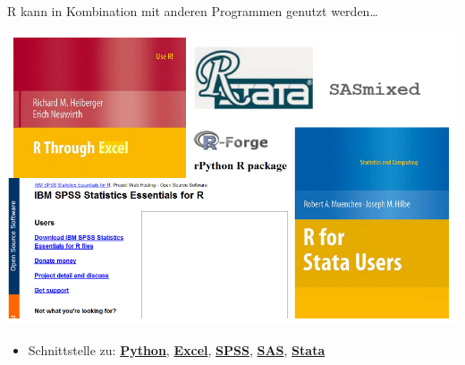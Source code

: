 \documentclass[ignorenonframetext,]{beamer}
\providecommand{\tightlist}{%
  \setlength{\itemsep}{0pt}\setlength{\parskip}{0pt}}
\begin{document}
\begin{frame}{R kann in Kombination mit anderen Programmen genutzt
werden\ldots{}}
\protect\hypertarget{r-kann-in-kombination-mit-anderen-programmen-genutzt-werden}{}

\includegraphics{figure/Rinterfaces.PNG}

\begin{itemize}
\tightlist
\item
  Schnittstelle zu:
  \href{https://cran.r-project.org/web/packages/reticulate/vignettes/calling_python.html}{\textbf{Python}},
  \href{https://www.springer.com/de/book/9781441900517}{\textbf{Excel}},
  \href{https://www.ibm.com/support/knowledgecenter/en/SSFUEU_7.2.0/com.ibm.swg.ba.cognos.op_capmod_ig.7.2.0.doc/t_essentials_for_r_statistics.html}{\textbf{SPSS}},
  \href{https://cran.r-project.org/web/packages/SASmixed/index.html}{\textbf{SAS}},
  \href{https://cran.r-project.org/web/packages/RStata/index.html}{\textbf{Stata}}
\end{itemize}

\end{frame}
\end{document}
